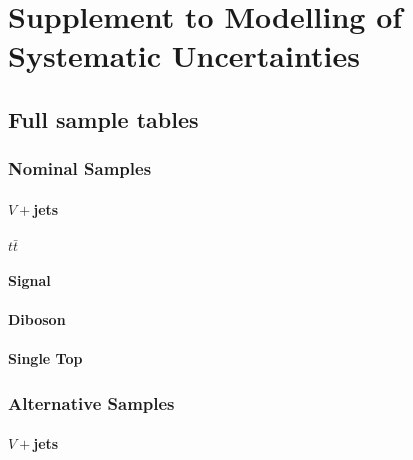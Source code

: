 \chapter{Supplement to Modelling of Systematic Uncertainties}
\label{app:syst-summary}

\section{Full sample tables}
\label{app:full-nominal-samples}
\subsection{Nominal Samples}
\subsubsection{$V+$jets}



\clearpage
\newpage
\subsubsection{\texorpdfstring{$t\bar{t}$}{tt}}

\clearpage
\newpage
\subsubsection{Signal}

\clearpage
\newpage
\subsubsection{Diboson}

\clearpage
\newpage
\subsubsection{Single Top}


\subsection{Alternative Samples}
\subsubsection{$V+$jets}


\clearpage
\newpage
